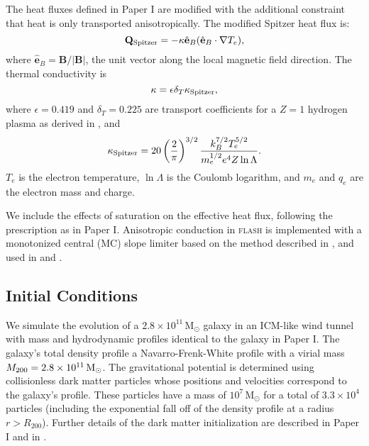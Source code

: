 \documentclass[twocolumn]{aastex6}
\newcommand{\msun}{\, \mbox{M}_{\odot}}
\newcommand{\flash}{{\normalfont\scshape flash }}
\begin{document}
The heat fluxes defined in Paper I are modified with the additional constraint that heat is only transported anisotropically. The modified Spitzer heat flux is:
\begin{equation}\label{eqn:conduction_aniso}
\mathbf{Q_{\rm Spitzer}} = -\kappa \hat{\mathbf{e}}_B (\hat{\mathbf{e}}_B \cdot \nabla T_e),
\end{equation}
where $\hat{\mathbf{e}}_B = \mathbf{B} / |\mathbf{B}|$, the unit vector along the local magnetic field direction.
The thermal conductivity is 
\begin{equation}
\kappa = \epsilon \delta_T \kappa_{\rm Spitzer},
\end{equation} where $\epsilon = 0.419$ and $\delta_T = 0.225$ are transport coefficients for a $Z = 1$ hydrogen plasma as derived in \citet{Spitzer53}, and 
\begin{equation}
\kappa_{\rm Spitzer} = 20 \left(\frac{2}{\pi}\right)^{3/2} \frac{k_B^{7/2} T_e^{5/2}}{m_e^{1/2} e^{4} Z \ln \Lambda}.
\end{equation}
$T_e$ is the electron temperature, $\ln \Lambda$ is the Coulomb logarithm, and $m_e$ and $q_e$ are the electron mass and charge. 


We include the effects of saturation on the effective heat flux, following the \citet{Cowie77} prescription as in Paper I. Anisotropic conduction in \flash is implemented  with a monotonized central (MC) slope limiter based on the method described in \citet{Sharma07}, and used in \citet{Ruszkowski10} and \citet{ZuHone13}. 


\subsection{Initial Conditions}
\label{sec:ic}
We simulate the evolution of a $2.8 \times 10^{11} \msun$ galaxy in an ICM-like wind tunnel with mass and hydrodynamic profiles identical to the galaxy in Paper I. The galaxy's total density profile a Navarro-Frenk-White profile \citep{Navarro97} with a virial mass $M_{\rm 200} = 2.8 \times 10^{11} \msun$. The gravitational potential is determined using collisionless dark matter particles whose positions and velocities correspond to the galaxy's profile. These particles have a mass of $10^7 \msun$ for a total of $3.3 \times 10^4$ particles (including the exponential fall off of the density profile at a radius $r > R_{200}$). Further details of the dark matter initialization are described in Paper I and in \citet{Vijayaraghavan17a}.
\end{document}
